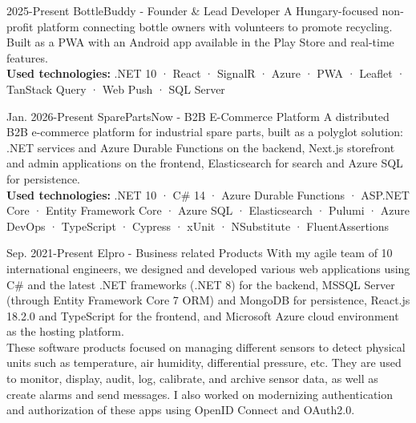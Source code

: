 \documentclass[9pt]{developercv}
\begin{document}
\begin{entrylist}
    \entry
    {2025-Present}
    {BottleBuddy - Founder \& Lead Developer}
    {}
    {A Hungary-focused non-profit platform connecting bottle owners with volunteers to promote recycling. Built as a PWA with an Android app available in the Play Store and real-time features. \\
    \textbf{Used technologies:} .NET 10 · React · SignalR · Azure · PWA · Leaflet · TanStack Query · Web Push · SQL Server}

    \entry
    {Jan. 2026-Present}                                                                                                                             {SparePartsNow - B2B E-Commerce Platform}                                                                                                        {}                                                                                                                                              {A distributed B2B e-commerce platform for industrial spare parts, built as a polyglot                                                           solution: .NET services and Azure Durable Functions on the backend, Next.js storefront                                                          and admin applications on the frontend, Elasticsearch for search and Azure SQL for                                                              persistence. \\
     \textbf{Used technologies:} .NET 10 · C\# 14 · Azure Durable Functions · ASP.NET Core ·                                                        Entity Framework Core · Azure SQL · Elasticsearch · Pulumi · Azure DevOps · TypeScript ·                                                       Cypress · xUnit · NSubstitute · FluentAssertions}

	\entry
		{Sep. 2021-Present}
		{Elpro - Business related Products}
		{}
		{With my agile team of 10 international engineers, we designed and developed various web applications using C\# and the latest .NET frameworks (.NET 8) for the backend, MSSQL Server (through Entity Framework Core 7 ORM) and MongoDB for persistence, React.js 18.2.0 and TypeScript for the frontend, and Microsoft Azure cloud environment as the hosting platform. \\

These software products focused on managing different sensors to detect physical units such as temperature, air humidity, differential pressure, etc. They are used to monitor, display, audit, log, calibrate, and archive sensor data, as well as create alarms and send messages. I also worked on modernizing authentication and authorization of these apps using OpenID Connect and OAuth2.0. \\

}
\end{entrylist}
\end{document}
